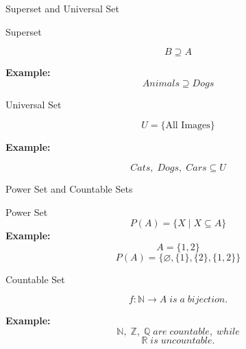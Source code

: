 \begin{frame}{Superset and Universal Set}

\begin{block}{Superset}

\[
B\supseteq A
\]

\textbf{Example:}
\[
Animals\supseteq Dogs
\]

\end{block}

\vspace{0.1cm}

\begin{block}{Universal Set}

\[
U=\{\text{All Images}\}
\]

\textbf{Example:}

\[
Cats,\;Dogs,\;Cars\subseteq U
\]

\end{block}

\end{frame}

\begin{frame}{Power Set and Countable Sets}

\begin{block}{Power Set}
\[
P(A)=\{X\mid X\subseteq A\}
\]
\textbf{Example:} 
\[
A=\{1,2\}\]
\[P(A)=\{\varnothing,\{1\},\{2\},\{1,2\}\}
\]

\end{block}

\vspace{0.1cm}

\begin{block}{Countable Set}

\[
f:\mathbb N\rightarrow A \;is \;a \;bijection.
\]

\textbf{Example:}
\[
\mathbb N,\;
\mathbb Z,\;
\mathbb Q
\;are \;countable, \;while\]
\[
\mathbb R\;
is\; uncountable.\]

\end{block}

\end{frame}